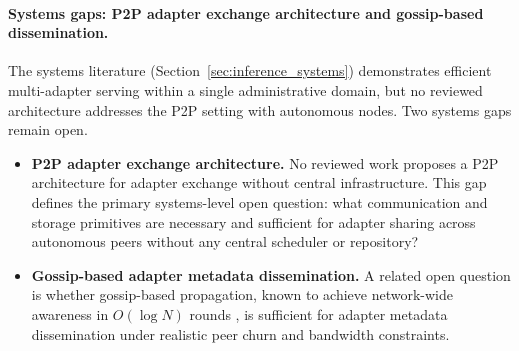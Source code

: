 \paragraph{Systems gaps: P2P adapter exchange architecture and gossip-based dissemination.}
The systems literature (Section~\ref{sec:inference_systems}) demonstrates efficient multi-adapter serving within a single administrative domain, but no reviewed architecture addresses the P2P setting with autonomous nodes. Two systems gaps remain open.
\begin{itemize}
  \item \textbf{P2P adapter exchange architecture.} No reviewed work proposes a P2P architecture for adapter exchange without central infrastructure. This gap defines the primary
    systems-level open question: what communication and storage primitives are
    necessary and sufficient for adapter sharing across autonomous peers without
    any central scheduler or repository?
  \item \textbf{Gossip-based adapter metadata dissemination.} A related open question
    is whether gossip-based propagation, known to achieve network-wide awareness
    in $O(\log N)$ rounds \cite{OrmandyGossip2013}, is sufficient for adapter
    metadata dissemination under realistic peer churn and bandwidth constraints.
\end{itemize}

